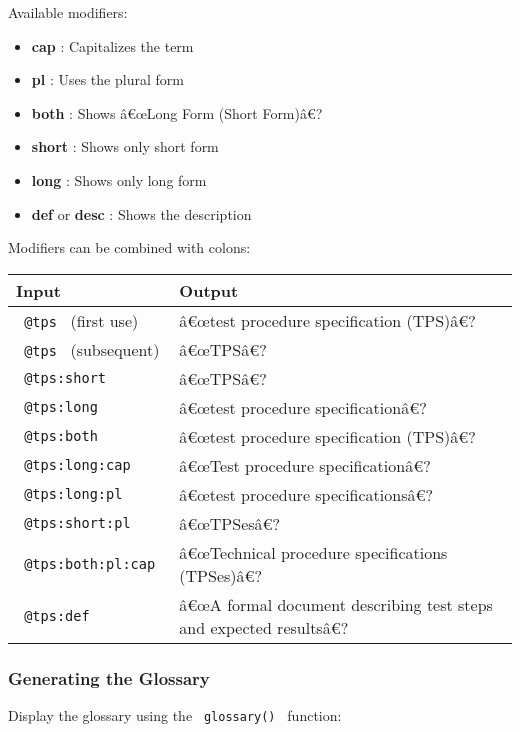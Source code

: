 Available modifiers:

\begin{itemize}
\tightlist
\item
  \textbf{cap} : Capitalizes the term
\item
  \textbf{pl} : Uses the plural form
\item
  \textbf{both} : Shows â€œLong Form (Short Form)â€?
\item
  \textbf{short} : Shows only short form
\item
  \textbf{long} : Shows only long form
\item
  \textbf{def} or \textbf{desc} : Shows the description
\end{itemize}

Modifiers can be combined with colons:

\begin{longtable}[]{@{}ll@{}}
\toprule\noalign{}
\textbf{Input} & \textbf{Output} \\
\midrule\noalign{}
\endhead
\bottomrule\noalign{}
\endlastfoot
\texttt{\ @tps\ } (first use) & â€œtest procedure specification
(TPS)â€? \\
\texttt{\ @tps\ } (subsequent) & â€œTPSâ€? \\
\texttt{\ @tps:short\ } & â€œTPSâ€? \\
\texttt{\ @tps:long\ } & â€œtest procedure specificationâ€? \\
\texttt{\ @tps:both\ } & â€œtest procedure specification (TPS)â€? \\
\texttt{\ @tps:long:cap\ } & â€œTest procedure specificationâ€? \\
\texttt{\ @tps:long:pl\ } & â€œtest procedure specificationsâ€? \\
\texttt{\ @tps:short:pl\ } & â€œTPSesâ€? \\
\texttt{\ @tps:both:pl:cap\ } & â€œTechnical procedure specifications
(TPSes)â€? \\
\texttt{\ @tps:def\ } & â€œA formal document describing test steps and
expected resultsâ€? \\
\end{longtable}

\subsubsection{Generating the Glossary}\label{generating-the-glossary}

Display the glossary using the \texttt{\ glossary()\ } function:

\begin{Shaded}
\begin{Highlighting}[]
\NormalTok{)}
\end{Highlighting}
\end{Shaded}

